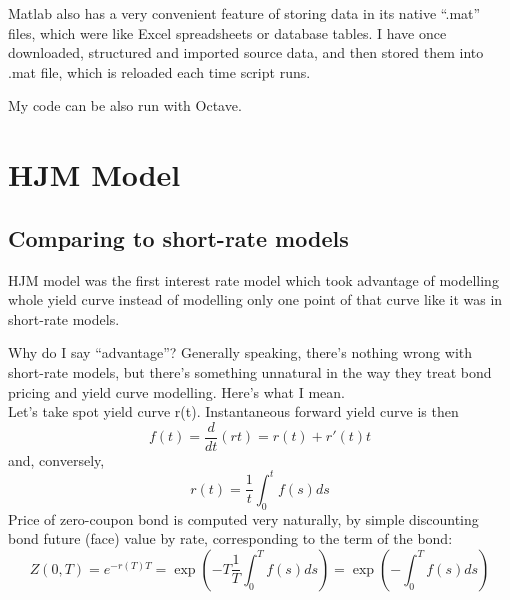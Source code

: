 \documentclass[11pt]{article} %
\begin{document}
Matlab also has a very convenient feature of storing data in its native ``.mat'' files, which were like Excel spreadsheets or database tables. I have once downloaded, structured and imported source data, and then stored them into .mat file, which is reloaded each time script runs.

My code can be also run with Octave. %

\section{HJM Model}

\subsection{Comparing to short-rate models}

HJM model was the first interest rate model which took advantage of modelling whole yield curve instead of modelling only one point of that curve like it was in short-rate models.

Why do I say ``advantage''? Generally speaking, there's nothing wrong with short-rate models, but there's something unnatural in the way they treat bond pricing and yield curve modelling. Here's what I mean.\\
Let's take spot yield curve r(t). Instantaneous forward yield curve is then %
\begin{equation}
f(t) = \frac{d}{dt}(rt) = r(t) + r'(t) t
\end{equation}
and, conversely, 
\begin{equation}
r(t) = \frac{1}{t}\int_{0}^{t}{f(s)ds}
\end{equation}
Price of zero-coupon bond is computed very naturally, by simple discounting bond future (face) value by rate, corresponding to the term of the bond:
\begin{equation} \label{eq:truebondprice}
Z(0,T) = e^{-r(T)T} = \exp\left(-T\frac{1}{T}\int_{0}^{T}{f(s)ds}\right) = \exp\left(-\int_{0}^{T}{f(s)ds}\right)
\end{equation}
\end{document}
